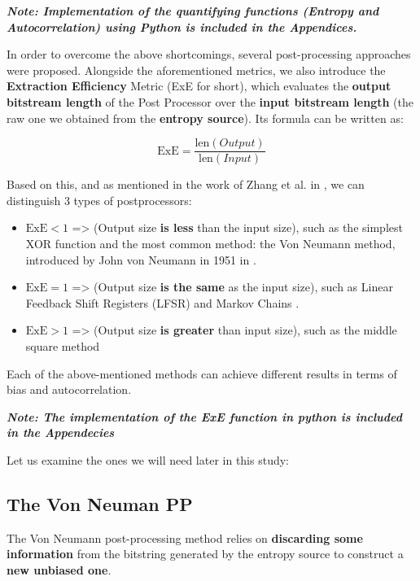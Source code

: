 \textit{\textbf{Note: Implementation of the quantifying functions (Entropy and Autocorrelation) using Python is included in the Appendices.} }

 
In order to overcome the above shortcomings, several post-processing approaches were proposed. Alongside the aforementioned metrics, we also introduce the \textbf{Extraction Efficiency} Metric (ExE for short), which evaluates the \textbf{output bitstream length} of the Post Processor over the \textbf{input bitstream length} (the raw one we obtained from the \textbf{entropy source}). Its formula can be written as:

\begin{equation}
    \text{ExE} = \frac{\text{len}(Output)}{\text{len}(Input)}
\end{equation}

Based on this, and as mentioned in the work of Zhang et al. in \cite{dede}, we can distinguish 3 types of postprocessors:

\begin{itemize}
    \item \( \text{ExE} < 1 \) => (Output size \textbf{is less} than the input size), such as the simplest XOR function and the most common method: the Von Neumann method, introduced by John von Neumann in 1951 in \cite{von_1951_various}.
    \item \( \text{ExE} = 1 \) => (Output size \textbf{is the same} as the input size), such as Linear Feedback Shift Registers (LFSR) \cite{LSFR} and Markov Chains \cite{markov}.
    \item \( \text{ExE} > 1 \) => (Output size \textbf{is greater} than input size), such as the middle square method \cite{MSMeth}
\end{itemize}

Each of the above-mentioned methods can achieve different results in terms of bias and autocorrelation.

\textbf{\textit{Note: The implementation of the ExE function in python is included in the Appendecies}}

\noindent Let us examine the ones we will need later in this study:

\subsection{The Von Neuman PP}

The Von Neumann post-processing method \cite{von_1951_various} relies on \textbf{discarding some information} from the bitstring generated by the entropy source to construct a \textbf{new unbiased one}.

